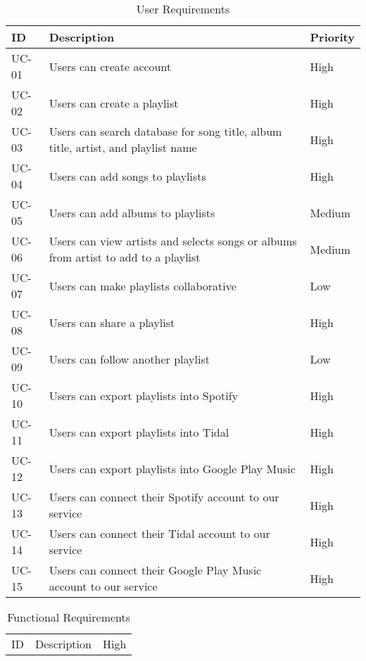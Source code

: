 \documentclass[12pt]{article}
\begin{document}
	\begin{table*}
		\centering
		\label{tab:ur}
		\caption*{User Requirements}
		\begin{tabularx}{450pt}{lXl}
			ID & Description & Priority\\\hline
			UC-01 & Users can create account & High \\
			UC-02 & Users can create a playlist & High \\
			UC-03 & Users can search database for song title, album title,
			artist, and playlist name & High \\
			UC-04 & Users can add songs to playlists & High \\
			UC-05 & Users can add albums to playlists & Medium \\
			UC-06 & Users can view artists and selects songs or albums from artist to add to a playlist & Medium \\
			UC-07 & Users can make playlists collaborative & Low \\
			UC-08 & Users can share a playlist & High \\
			UC-09 & Users can follow another playlist & Low\\
			UC-10 & Users can export playlists into Spotify & High \\
			UC-11 & Users can export playlists into Tidal & High \\
			UC-12 & Users can export playlists into Google Play Music & High \\
			UC-13 & Users can connect their Spotify account to our service & High \\
			UC-14 & Users can connect their Tidal account to our service & High \\
			UC-15 & Users can connect their Google Play Music account to our service & High \\
		\end{tabularx}
	\end{table*}
	\begin{table*}
		\centering
		\label{tab:fr}
		\caption*{Functional Requirements}
		\begin{tabularx}{450pt}{lXl}
			ID & Description & High \\
			
		\end{tabularx}
	\end{table*}
\end{document}

